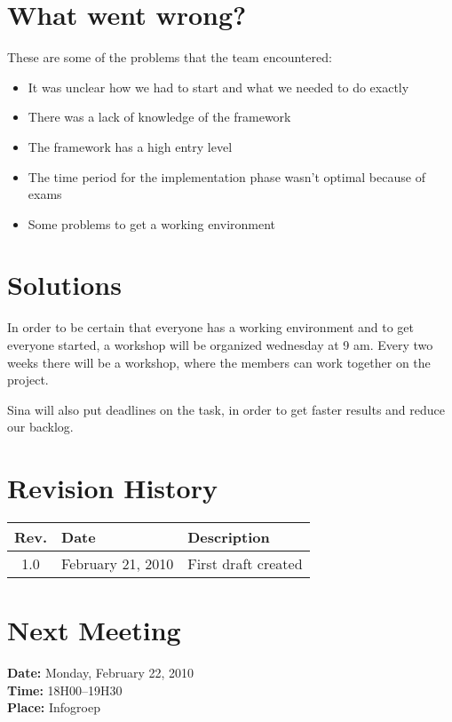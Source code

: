 \documentclass[a4paper, 12pt]{article}
\begin{document}
\section{What went wrong?}
	These are some of the problems that the team encountered:
	\begin{itemize}
		\item It was unclear how we had to start and what we needed to do exactly
		\item There was a lack of knowledge of the framework
		\item The framework has a high entry level
		\item The time period for the implementation phase wasn't optimal because of exams
		\item Some problems to get a working environment
	\end{itemize}

\section{Solutions}
	In order to be certain that everyone has a working environment and to get everyone started, a workshop will be organized wednesday at 9 am. Every two weeks there will be a workshop, where the members can work together on the project.
	
	Sina will also put deadlines on the task, in order to get faster results and reduce our backlog.
			
\section{Revision History}
	\begin{tabular}{c | l | l }
		\textbf{Rev.} & \textbf{Date} & \textbf{Description} \\
		\hline
		1.0 & February 21, 2010 & First draft created \\
	\end{tabular}		
			
			
\section{Next Meeting}

	\textbf{Date:} Monday, February 22, 2010\\
	\textbf{Time:} 18H00--19H30\\
	\textbf{Place:} Infogroep\\
	
\end{document}
